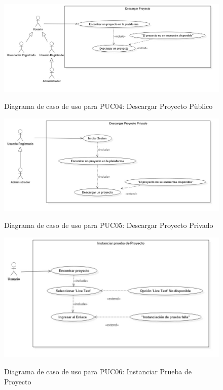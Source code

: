 \begin{figure}[!ht]
\includegraphics[width=\textwidth]{images/usecase/PUC04}
\label{FIG:CU_PUC04}
\caption{Diagrama de caso de uso para PUC04: Descargar Proyecto P\`ublico}
\end{figure}

\begin{figure}[!ht]
\includegraphics[width=\textwidth]{images/usecase/PUC05}
\label{FIG:CU_PUC05}
\caption{Diagrama de caso de uso para PUC05: Descargar Proyecto Privado}
\end{figure}

\begin{figure}[!ht]
\includegraphics[width=\textwidth]{images/usecase/PUC06}
\label{FIG:CU_PUC06}
\caption{Diagrama de caso de uso para PUC06: Instanciar Prueba de Proyecto}
\end{figure}

